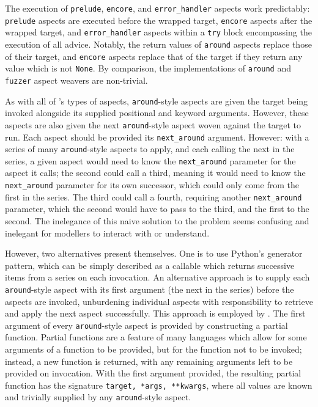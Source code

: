 The execution of \lstinline{prelude}, \lstinline{encore}, and
\lstinline{error_handler} aspects work predictably: \lstinline{prelude} aspects
are executed before the wrapped target, \lstinline{encore} aspects after the
wrapped target, and \lstinline{error_handler} aspects within a \lstinline{try}
block encompassing the execution of all advice. Notably, the return values of
\lstinline{around} aspects replace those of their target, and \lstinline{encore}
aspects replace that of the target if they return any value which is not \lstinline{None}.
By comparison, the implementations of \lstinline{around} and \lstinline{fuzzer}
aspect weavers are non-trivial.

As with all of \pdsf{}'s types of aspects, \lstinline{around}-style  aspects are given the target being invoked
alongside its supplied positional and keyword arguments. However, these aspects
are also given the next \lstinline{around}-style aspect woven against the target
to run. Each aspect should be provided its \lstinline{next_around} argument.
However: with a series of many \lstinline{around}-style aspects to apply, and
each calling the next in the series, a given aspect would need to know the
\lstinline{next_around} parameter for the aspect it calls; the second could call
a third, meaning it would need to know the \lstinline{next_around} parameter for
its own successor, which could only come from the first in the series. The third
could call a fourth, requiring another \lstinline{next_around} parameter, which
the second would have to pass to the third, and the first to the second. The
inelegance of this naive solution to the problem seems confusing and inelegant
for modellers to interact with or understand.

However, two alternatives present themselves. One is to use Python's generator
pattern, which can be simply described as a callable which returns successive
items from a series on each invocation. An alternative approach is to supply
each \lstinline{around}-style aspect with its first argument (the next in the
series) before the aspects are invoked, unburdening individual aspects with
responsibility to retrieve and apply the next aspect successfully. This approach
is employed by \pdsf{}. The first argument of every \lstinline{around}-style
aspect is provided by constructing a partial function. Partial functions are a
feature of many languages which allow for some arguments of a function to be
provided, but for the function not to be invoked; instead, a new function is
returned, with any remaining arguments left to be provided on invocation. With
the first argument provided, the resulting partial function has the signature
\lstinline{target, *args, **kwargs}, where all values are known and trivially
supplied by any \lstinline{around}-style aspect.

